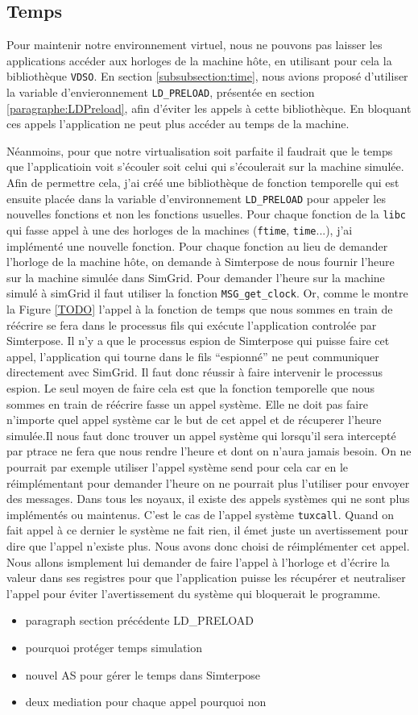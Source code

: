 \subsection{Temps}
Pour maintenir notre environnement virtuel, nous ne pouvons pas laisser les applications accéder aux horloges de la machine hôte, en utilisant pour cela la bibliothèque \texttt{VDSO}. En section \ref{subsubsection:time}, nous avions proposé d'utiliser la variable d'envieronnement \texttt{LD\_PRELOAD}, présentée en section \ref{paragraphe:LDPreload}, afin d'éviter les appels à cette bibliothèque. En bloquant ces appels l'application ne peut plus accéder au temps de la machine.

Néanmoins, pour que notre virtualisation soit parfaite il faudrait que le temps que l'applicatioin voit s'écouler soit celui qui s'écoulerait sur la machine simulée. Afin de permettre cela, j'ai créé une bibliothèque de fonction temporelle qui est ensuite placée dans la variable d'environnement \texttt{LD\_PRELOAD} pour appeler les nouvelles fonctions et non les fonctions usuelles. Pour chaque fonction de la \texttt{libc} qui fasse appel à une des horloges de la machines (\texttt{ftime}, \texttt{time}...), j'ai implémenté une nouvelle fonction. Pour chaque fonction au lieu de demander l'horloge de la machine hôte, on demande à Simterpose de nous fournir l'heure sur la machine simulée dans SimGrid. Pour demander l'heure sur la machine simulé à simGrid il faut utiliser la fonction \texttt{MSG\_get\_clock}. Or, comme le montre la Figure \ref{TODO} l'appel à la fonction de temps que nous sommes en train de réécrire se fera dans le processus fils qui exécute l'application controlée par Simterpose. Il n'y a que le processus espion de Simterpose qui puisse faire cet appel, l'application qui tourne dans le fils ``espionné'' ne peut communiquer directement avec SimGrid. Il faut donc réussir à faire intervenir le processus espion. Le seul moyen de faire cela est que la fonction temporelle que nous sommes en train de réécrire fasse un appel système. Elle ne doit pas faire n'importe quel appel système car le but de cet appel et de récuperer l'heure simulée.Il nous faut donc trouver un appel système qui lorsqu'il sera intercepté par ptrace ne fera que nous rendre l'heure et dont on n'aura jamais besoin. On ne pourrait par exemple utiliser l'appel système send pour cela car en le réimplémentant pour demander l'heure on ne pourrait plus l'utiliser pour envoyer des messages. Dans tous les noyaux, il existe des appels systèmes qui ne sont plus implémentés ou maintenus. C'est le cas de l'appel système \texttt{tuxcall}. Quand on fait appel à ce dernier le système ne fait rien, il émet juste un avertissement pour dire que l'appel n'existe plus. Nous avons donc choisi de réimplémenter cet appel. Nous allons ismplement lui demander de faire l'appel à l'horloge et d'écrire la valeur dans ses registres pour que l'application puisse les récupérer et neutraliser l'appel pour éviter l'avertissement du système qui bloquerait le programme.
\begin{itemize}
\item paragraph section précédente LD\_PRELOAD
\item pourquoi protéger temps simulation
\item nouvel AS pour gérer le temps dans Simterpose
\item deux mediation pour chaque appel pourquoi non
\end{itemize}

